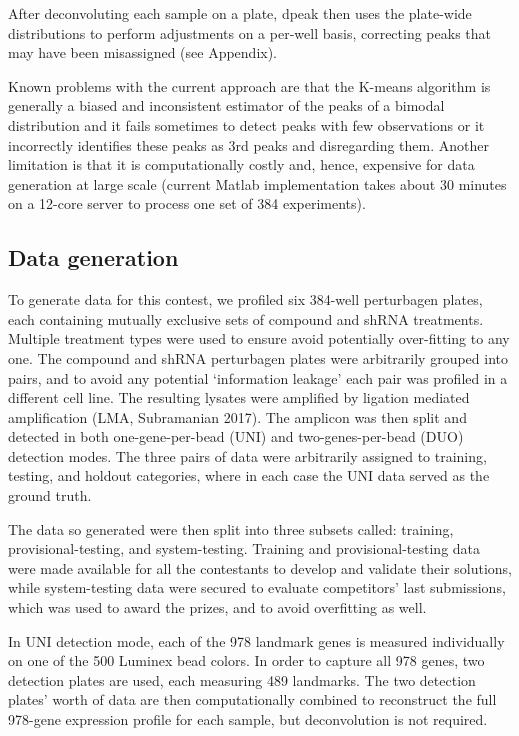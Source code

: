 \documentclass[]{article}
\begin{document}
After deconvoluting each sample on a plate, dpeak then uses the
plate-wide distributions to perform adjustments on a per-well basis,
correcting peaks that may have been misassigned (see Appendix).

Known problems with the current approach are that the K-means algorithm
is generally a biased and inconsistent estimator of the peaks of a
bimodal distribution and it fails sometimes to detect peaks with few
observations or it incorrectly identifies these peaks as 3rd peaks and
disregarding them. Another limitation is that it is computationally
costly and, hence, expensive for data generation at large scale (current
Matlab implementation takes about 30 minutes on a 12-core server to
process one set of 384 experiments).

\hypertarget{data-generation}{%
\subsection{Data generation}\label{data-generation}}

To generate data for this contest, we profiled six 384-well perturbagen
plates, each containing mutually exclusive sets of compound and shRNA
treatments. Multiple treatment types were used to ensure avoid
potentially over-fitting to any one. The compound and shRNA perturbagen
plates were arbitrarily grouped into pairs, and to avoid any potential
`information leakage' each pair was profiled in a different cell line.
The resulting lysates were amplified by ligation mediated amplification
(LMA, Subramanian 2017). The amplicon was then split and detected in
both one-gene-per-bead (UNI) and two-genes-per-bead (DUO) detection
modes. The three pairs of data were arbitrarily assigned to training,
testing, and holdout categories, where in each case the UNI data served
as the ground truth.

The data so generated were then split into three subsets called:
training, provisional-testing, and system-testing. Training and
provisional-testing data were made available for all the contestants to
develop and validate their solutions, while system-testing data were
secured to evaluate competitors' last submissions, which was used to
award the prizes, and to avoid overfitting as well.

In UNI detection mode, each of the 978 landmark genes is measured
individually on one of the 500 Luminex bead colors. In order to capture
all 978 genes, two detection plates are used, each measuring 489
landmarks. The two detection plates' worth of data are then
computationally combined to reconstruct the full 978-gene expression
profile for each sample, but deconvolution is not required.
\end{document}
